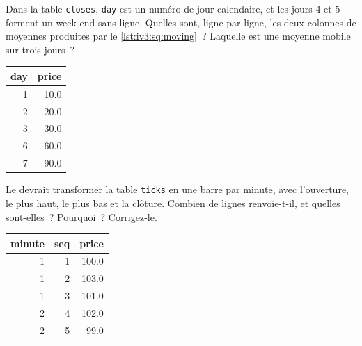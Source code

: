 \begin{question}\label{iq:iv3:sql-and-data:11}
Dans la table \texttt{closes}, \texttt{day} est un numéro de jour calendaire, et les jours 4 et 5 forment un week-end sans ligne. Quelles sont, ligne par ligne, les deux colonnes de moyennes produites par le \cref{lst:iv3:sq:moving}~? Laquelle est une moyenne mobile sur trois jours~?
\begin{center}\small
\begin{tabular}{rr}
day & price\\\hline
1 & 10.0\\
2 & 20.0\\
3 & 30.0\\
6 & 60.0\\
7 & 90.0
\end{tabular}
\end{center}
\label{lst:iv3:sq:moving}
\end{question}

\begin{question}\label{iq:iv3:sql-and-data:12}
Le  devrait transformer la table \texttt{ticks} en une barre par minute, avec l'ouverture, le plus haut, le plus bas et la clôture. Combien de lignes renvoie-t-il, et quelles sont-elles~? Pourquoi~? Corrigez-le.
\begin{center}\small
\begin{tabular}{rrr}
minute & seq & price\\\hline
1 & 1 & 100.0\\
1 & 2 & 103.0\\
1 & 3 & 101.0\\
2 & 4 & 102.0\\
2 & 5 & 99.0
\end{tabular}
\end{center}
\label{lst:iv3:sq:barsbad}
\end{question}

